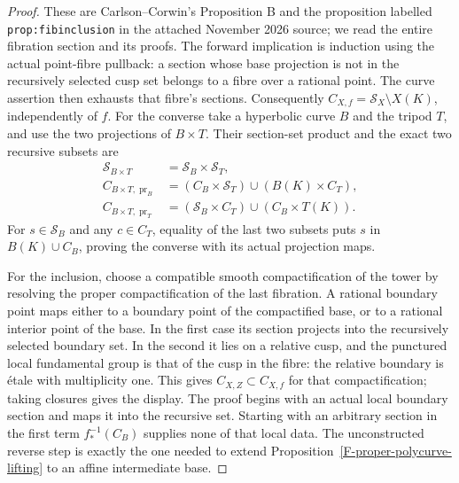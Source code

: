 \documentclass[11pt,oneside]{article}
\begin{document}
\begin{proof}
These are Carlson--Corwin's Proposition B and the proposition
labelled \texttt{prop:fibinclusion} in the attached November
2026 source\cite{F-CarlsonCorwin}; we read the entire
fibration section and its proofs. The forward implication is
induction using the actual point-fibre pullback: a section
whose base projection is not in the recursively selected cusp
set belongs to a fibre over a rational point. The curve
assertion then exhausts that fibre's sections. Consequently
$C_{X,f}=\mathcal S_X\setminus X(K)$, independently of $f$.
For the converse take a hyperbolic curve $B$ and the tripod
$T$, and use the two projections of $B\times T$. Their
section-set product and the exact two recursive subsets are
\[
\begin{split}
 \mathcal S_{B\times T}&=\mathcal S_B\times\mathcal S_T,\\
 C_{B\times T,\operatorname{pr}_B}
   &=(C_B\times\mathcal S_T)\cup(B(K)\times C_T),\\
 C_{B\times T,\operatorname{pr}_T}
   &=(\mathcal S_B\times C_T)\cup(C_B\times T(K)).
\end{split}
\]
For $s\in\mathcal S_B$ and any $c\in C_T$, equality of the
last two subsets puts $s$ in $B(K)\cup C_B$, proving the
converse with its actual projection maps.

For the inclusion, choose a compatible smooth compactification
of the tower by resolving the proper compactification of the
last fibration. A rational boundary point maps either to a
boundary point of the compactified base, or to a rational
interior point of the base. In the first case its section
projects into the recursively selected boundary set. In the
second it lies on a relative cusp, and the punctured local
fundamental group is that of the cusp in the fibre: the
relative boundary is \'etale with multiplicity one. This
gives $C_{X,Z}\subset C_{X,f}$ for that compactification;
taking closures gives the display. The proof begins with an
actual local boundary section and maps it into the recursive
set. Starting with an arbitrary section in the first term
$f_*^{-1}(C_B)$ supplies none of that local data. The
unconstructed reverse step is exactly the one needed to
extend Proposition~\ref{F-proper-polycurve-lifting} to an
affine intermediate base.
\end{proof}
\end{document}
